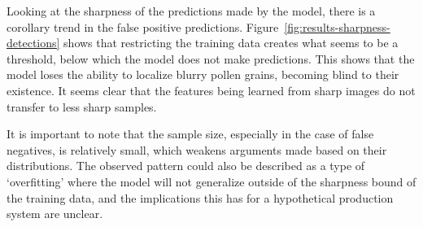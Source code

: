 Looking at the sharpness of the predictions made by the model, there is a corollary trend in the false positive predictions.
Figure~\ref{fig:results-sharpness-detections} shows that restricting the training data creates what seems to be a threshold, below which the model does not make predictions.
This shows that the model loses the ability to localize blurry pollen grains, becoming blind to their existence.
It seems clear that the features being learned from sharp images do not transfer to less sharp samples.

It is important to note that the sample size, especially in the case of false negatives, is relatively small, which weakens arguments made based on their distributions.
The observed pattern could also be described as a type of `overfitting' where the model will not generalize outside of the sharpness bound of the training data, and the implications this has for a hypothetical production system are unclear.

